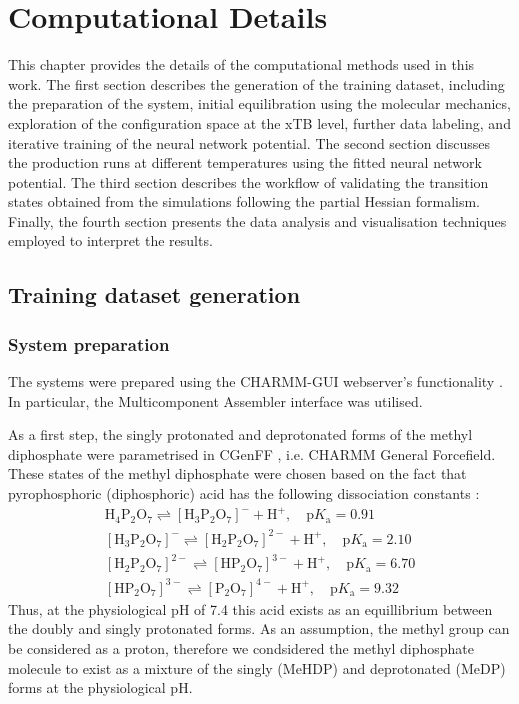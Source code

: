 \chapter{Computational Details}
This chapter provides the details of the computational methods used in this work. The first section describes the generation of the training dataset, including the preparation of the system, initial equilibration using the molecular mechanics, exploration of the configuration space at the xTB level, further data labeling, and iterative training of the neural network potential. The second section discusses the production runs at different temperatures using the fitted neural network potential. The third section describes the workflow of validating the transition states obtained from the simulations following the partial Hessian formalism. Finally, the fourth section presents the data analysis and visualisation techniques employed to interpret the results.



\section{Training dataset generation}



\subsection{System preparation}
The systems were prepared using the CHARMM-GUI webserver's functionality \citep{jo_charmm-gui_2008}. In particular, the Multicomponent Assembler interface \citep{kern_charmm-gui_2024} was utilised. 

As a first step, the singly protonated and deprotonated forms of the methyl diphosphate were parametrised in CGenFF \citep{kim_charmm-gui_2017}, i.e. CHARMM General Forcefield. These states of the methyl diphosphate were chosen based on the fact that pyrophosphoric (diphosphoric) acid has the following dissociation constants \citep{haynes_crc_2016}:
\begin{align*}
    \mathrm{H_4P_2O_7} \rightleftharpoons \mathrm{[H_3P_2O_7]^-} + \mathrm{H^+},\quad \mathrm{p}K_\mathrm{a} = 0.91 \\
    \mathrm{[H_3P_2O_7]^-} \rightleftharpoons \mathrm{[H_2P_2O_7]^{2-}} + \mathrm{H^+},\quad \mathrm{p}K_\mathrm{a} = 2.10 \\
    \mathrm{[H_2P_2O_7]^{2-}} \rightleftharpoons \mathrm{[HP_2O_7]^{3-}} + \mathrm{H^+},\quad \mathrm{p}K_\mathrm{a} = 6.70 \\
    \mathrm{[HP_2O_7]^{3-}} \rightleftharpoons \mathrm{[P_2O_7]^{4-}} + \mathrm{H^+},\quad \mathrm{p}K_\mathrm{a} = 9.32
\end{align*}
Thus, at the physiological pH of 7.4 this acid exists as an equillibrium between the doubly and singly protonated forms. As an assumption, the methyl group can be considered as a proton, therefore we condsidered the methyl diphosphate molecule to exist as a mixture of the singly (MeHDP) and deprotonated (MeDP) forms at the physiological pH.

